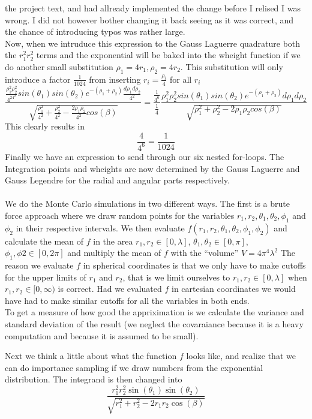 \documentclass[a4paper,english, 10pt, twoside]{article}
\begin{document}
the project text, and had allready implemented the change before I relised I was wrong. I did not however bother changing it back 
seeing as it was correct, and the chance of introducing typos was rather large.\\
Now, when we intruduce this expression to the Gauss Laguerre quadrature both the $r_1^2r_2^2$ terms and the exponential will be 
baked into the wheight function if we do another small substitution $\rho_1 = 4r_1, \rho_2 = 4r_2$. This substitution will only 
introduce a factor $\frac{1}{1024}$ from inserting $r_i = \frac{\rho_i}{4}$ for all $r_i$ 
$$
\frac{\frac{\rho_1^2\rho_2^2}{4^24^2}sin(\theta_1)sin(\theta_2)e^{-(\rho_1+\rho_2)}\frac{d\rho_1d\rho_2}{4^2}}
{\sqrt{\frac{\rho_1^2}{4^2}+\frac{\rho_2^2}{4^2}-\frac{2\rho_1\rho_2}{4^2}cos(\beta)}} = 
\frac{\frac{1}{4^6}}{\frac{1}{4}}\frac{\rho_1^2\rho_2^2sin(\theta_1)sin(\theta_2)e^{-(\rho_1+\rho_2)}d\rho_1d\rho_2}
{\sqrt{\rho_1^2+\rho_2^2-2\rho_1\rho_2cos(\beta)}}
$$
This clearly results in 
$$
\frac{4}{4^6} = \frac{1}{1024}
$$
Finally we have an expression to send through our six nested for-loops. The Integration points and wheights are now determined 
by the Gauss Laguerre and Gauss Legendre for the radial and angular parts respectively.\\ \\

We do the Monte Carlo simulations in two different ways. The first is a brute force approach where we draw random points for the 
variables $r_1, r_2, \theta_1 , \theta_2 , \phi_1$ and $\phi_2$ in their respective intervals. We then evaluate 
$f(r_1, r_2, \theta_1 , \theta_2 , \phi_1, \phi_2)$ and calculate the mean of $f$ in the area $r_1,r_2 \in [0,\lambda]$, 
$\theta_1,\theta_2 \in [0,\pi]$, $\phi_1,\phi2 \in [0,2\pi]$ and multiply the mean of $f$ with the ``volume'' $V = 4\pi^4\lambda^2$
The reason we evaluate $f$ in spherical coordinates is that we only have to make cutoffs for the upper limits of $r_1$ and $r_2$, 
that is we limit ourselves to $r_1,r_2 \in [0,\lambda]$ when $r_1,r_2 \in [0,\infty)$ is correct. Had we evaluated $f$ in cartesian 
coordinates we would have had to make similar cutoffs for all the variables in both ends.\\
To get a measure of how good the appriximation is we calculate the variance and standard deviation of the result (we neglect the 
covaraiance because it is a heavy computation and because it is assumed to be small).

Next we think a little about what the function $f$ looks like, and realize that we can do importance sampling if we draw numbers 
from the exponential distribution. The integrand is then changed into
$$
\frac{r_1^2r_2^2\sin(\theta_1)\sin(\theta_2)}{\sqrt{r_1^2 + r_2^2 -2r_1r_2\cos(\beta)}}
$$
\end{document}

